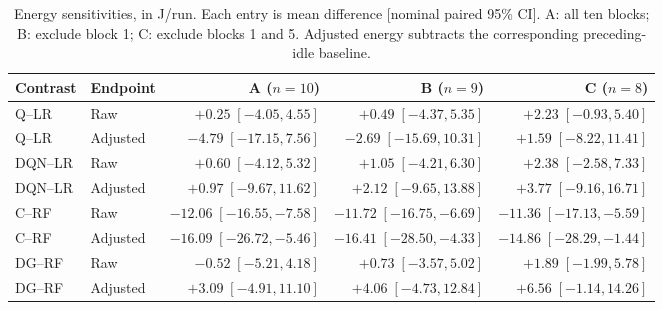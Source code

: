 \begin{table}[t]\centering\footnotesize
\caption{Energy sensitivities, in J/run. Each entry is mean difference [nominal paired 95\% CI]. A: all ten blocks; B: exclude block 1; C: exclude blocks 1 and 5. Adjusted energy subtracts the corresponding preceding-idle baseline.}\label{tab:sensitivity}
\setlength{\tabcolsep}{4pt}\begin{tabular}{llrrr}\toprule Contrast & Endpoint & A ($n=10$) & B ($n=9$) & C ($n=8$)\\\midrule
Q--LR & Raw & $+0.25\;[-4.05,4.55]$ & $+0.49\;[-4.37,5.35]$ & $+2.23\;[-0.93,5.40]$\\
Q--LR & Adjusted & $-4.79\;[-17.15,7.56]$ & $-2.69\;[-15.69,10.31]$ & $+1.59\;[-8.22,11.41]$\\
DQN--LR & Raw & $+0.60\;[-4.12,5.32]$ & $+1.05\;[-4.21,6.30]$ & $+2.38\;[-2.58,7.33]$\\
DQN--LR & Adjusted & $+0.97\;[-9.67,11.62]$ & $+2.12\;[-9.65,13.88]$ & $+3.77\;[-9.16,16.71]$\\
C--RF & Raw & $-12.06\;[-16.55,-7.58]$ & $-11.72\;[-16.75,-6.69]$ & $-11.36\;[-17.13,-5.59]$\\
C--RF & Adjusted & $-16.09\;[-26.72,-5.46]$ & $-16.41\;[-28.50,-4.33]$ & $-14.86\;[-28.29,-1.44]$\\
DG--RF & Raw & $-0.52\;[-5.21,4.18]$ & $+0.73\;[-3.57,5.02]$ & $+1.89\;[-1.99,5.78]$\\
DG--RF & Adjusted & $+3.09\;[-4.91,11.10]$ & $+4.06\;[-4.73,12.84]$ & $+6.56\;[-1.14,14.26]$\\
\bottomrule\end{tabular}\end{table}
